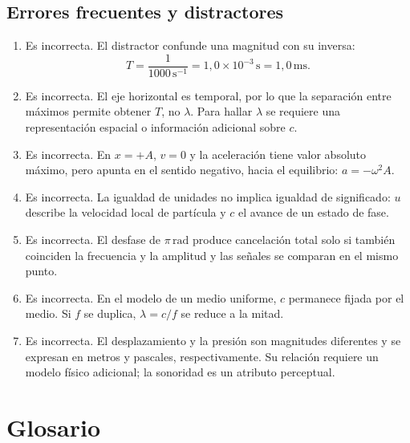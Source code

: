 \subsection*{Errores frecuentes y distractores}

\begin{enumerate}[label=\textbf{D\arabic*.},leftmargin=*]
    \item Es incorrecta. El distractor confunde una magnitud con su inversa:
    \[
        T=\frac{1}{1000\,\text{s}^{-1}}
          =1{,}0\times10^{-3}\,\text{s}
          =1{,}0\,\text{ms}.
    \]

    \item Es incorrecta. El eje horizontal es temporal, por lo que la
    separación entre máximos permite obtener \(T\), no \(\lambda\). Para
    hallar \(\lambda\) se requiere una representación espacial o información
    adicional sobre \(c\).

    \item Es incorrecta. En \(x=+A\), \(v=0\) y la aceleración tiene valor
    absoluto máximo, pero apunta en el sentido negativo, hacia el equilibrio:
    \(a=-\omega^{2}A\).

    \item Es incorrecta. La igualdad de unidades no implica igualdad de
    significado: \(u\) describe la velocidad local de partícula y \(c\) el
    avance de un estado de fase.

    \item Es incorrecta. El desfase de \(\pi\,\text{rad}\) produce
    cancelación total solo si también coinciden la frecuencia y la amplitud y
    las señales se comparan en el mismo punto.

    \item Es incorrecta. En el modelo de un medio uniforme, \(c\) permanece
    fijada por el medio. Si \(f\) se duplica, \(\lambda=c/f\) se reduce a la
    mitad.

    \item Es incorrecta. El desplazamiento y la presión son magnitudes
    diferentes y se expresan en metros y pascales, respectivamente. Su
    relación requiere un modelo físico adicional; la sonoridad es un atributo
    perceptual.
\end{enumerate}

\section{Glosario}
\label{sec:u3-glosario}

